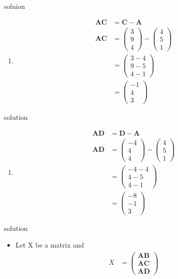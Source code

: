 \documentclass{beamer}
\let\vec\mathbf
\newcommand{\myvec}[1]{\ensuremath{\begin{pmatrix}#1\end{pmatrix}}}
\begin{document}
 
 \begin{frame}{soluion}
 \begin{enumerate}
 \item 
 \begin{align}
     \vec{AC} & = \vec{C}-\vec{A}\\
     \vec{AC} & = \myvec{3\\9\\4}-\myvec{4\\5\\1}\nonumber\\
              & = \myvec{3-4\\9-5\\4-1}\nonumber\\
              & = \myvec{-1\\4\\3}
 \end{align}
 \end{enumerate}
 \end{frame}
 
 
 \begin{frame}{solution}
 \begin{enumerate}
 \item 
 \begin{align}
     \vec{AD} & = \vec{D}-\vec{A}\\
     \vec{AD} & = \myvec{-4\\4\\4}-\myvec{4\\5\\1}\nonumber\\
              & = \myvec{-4-4\\4-5\\4-1}\nonumber\\
              & = \myvec{-8\\-1\\3}
 \end{align}
 \end{enumerate}
 \end{frame}
 
 \begin{frame}{solution}
 \begin{itemize}
\item 
Let X be a matrix and
\begin{align}
    X & = \myvec{\vec{AB}\\\vec{AC}\\\vec{AD}}
\end{align}
\end{itemize}
\end{frame}
 
\end{document}
